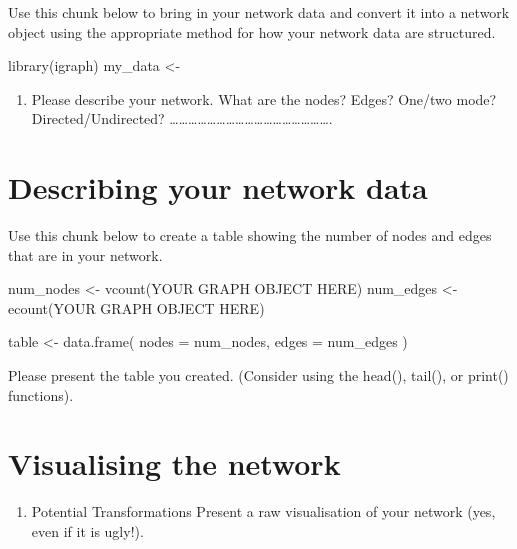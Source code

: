 \documentclass[
  letterpaper,
  DIV=11,
  numbers=noendperiod]{scrreprt}
\newenvironment{Shaded}{\begin{snugshade}}{\end{snugshade}}
\newcommand{\AttributeTok}[1]{\textcolor[rgb]{0.40,0.45,0.13}{#1}}
\newcommand{\FunctionTok}[1]{\textcolor[rgb]{0.28,0.35,0.67}{#1}}
\newcommand{\NormalTok}[1]{\textcolor[rgb]{0.00,0.23,0.31}{#1}}
\newcommand{\OtherTok}[1]{\textcolor[rgb]{0.00,0.23,0.31}{#1}}
\providecommand{\tightlist}{%
  \setlength{\itemsep}{0pt}\setlength{\parskip}{0pt}}\usepackage{longtable,booktabs,array}
\begin{document}
Use this chunk below to bring in your network data and convert it into a
network object using the appropriate method for how your network data
are structured.

\begin{Shaded}
\begin{Highlighting}[]
\FunctionTok{library}\NormalTok{(igraph)}
\NormalTok{my\_data }\OtherTok{\textless{}{-}} 
\end{Highlighting}
\end{Shaded}

\begin{enumerate}
\def\labelenumi{\arabic{enumi})}
\setcounter{enumi}{2}
\tightlist
\item
  Please describe your network. What are the nodes? Edges? One/two mode?
  Directed/Undirected?
  \ldots\ldots\ldots\ldots\ldots\ldots\ldots\ldots\ldots\ldots\ldots\ldots\ldots\ldots\ldots\ldots\ldots.
\end{enumerate}

\section{Describing your network
data}\label{describing-your-network-data}

Use this chunk below to create a table showing the number of nodes and
edges that are in your network.

\begin{Shaded}
\begin{Highlighting}[]
\NormalTok{num\_nodes }\OtherTok{\textless{}{-}} \FunctionTok{vcount}\NormalTok{(YOUR GRAPH OBJECT HERE)}
\NormalTok{num\_edges }\OtherTok{\textless{}{-}} \FunctionTok{ecount}\NormalTok{(YOUR GRAPH OBJECT HERE)}

\NormalTok{table }\OtherTok{\textless{}{-}} \FunctionTok{data.frame}\NormalTok{( }
  \AttributeTok{nodes =}\NormalTok{ num\_nodes,}
  \AttributeTok{edges =}\NormalTok{ num\_edges}
\NormalTok{  )}
\end{Highlighting}
\end{Shaded}

Please present the table you created. (Consider using the head(),
tail(), or print() functions).

\section{Visualising the network}\label{visualising-the-network}

\begin{enumerate}
\def\labelenumi{\arabic{enumi})}
\setcounter{enumi}{3}
\tightlist
\item
  Potential Transformations Present a raw visualisation of your network
  (yes, even if it is ugly!).
\end{enumerate}
\end{document}
